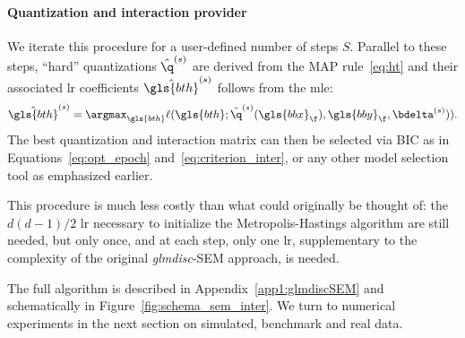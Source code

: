 \paragraph{Quantization and interaction provider}

We iterate this procedure for a user-defined number of steps $S$. Parallel to these steps, ``hard'' quantizations $\hat{\q}^{(s)}$ are derived from the MAP rule~\eqref{eq:ht} and their associated \gls{lr} coefficients $\hat{\gls{bth}}^{(s)}$ follows from the \gls{mle}:
\[\hat{\gls{bth}}^{(s)} = \argmax_{\gls{bth}} \ell(\gls{bth}; \hat{\q}^{(s)}(\gls{bbx}_\f), \gls{bby}_\f, \bdelta^{(s)})).\]
The best quantization and interaction matrix can then be selected via BIC as in Equations~\eqref{eq:opt_epoch} and~\eqref{eq:criterion_inter}, or any other model selection tool as emphasized earlier.

This procedure is much less costly than what could originally be thought of: the $d(d-1)/2$ \gls{lr} necessary to initialize the Metropolis-Hastings algorithm are still needed, but only once, and at each step, only one \gls{lr}, supplementary to the complexity of the original \textit{glmdisc}-SEM approach, is needed.

The full algorithm is described in Appendix~\ref{app1:glmdiscSEM} and schematically in Figure~\ref{fig:schema_sem_inter}. We turn to numerical experiments in the next section on simulated, benchmark and real data.

